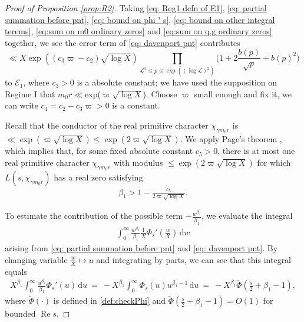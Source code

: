 \documentclass[12pt,reqno]{amsart}
\numberwithin{equation}{section}
\theoremstyle{plain}
\theoremstyle{definition}
\theoremstyle{remark}
\renewcommand{\Re}{\operatorname{Re}}
\newcommand{\dd}{\mathrm{d}}
\begin{document}
\begin{proof}[Proof of Proposition \ref{prop:R2}]
Taking \eqref{eq: Reg1 defn of E1}, \eqref{eq:  partial summation before pnt}, \eqref{eq: bound on phi ' s}, \eqref{eq: bound on other integral terems}, \eqref{eq:sum on m0 ordinary zeros} and \eqref{eq:sum on q,g ordinary zeros} together,
we see the error term of \eqref{eq:  davenport pnt} contributes
\begin{equation*}\label{eq: regime I ordinary zeros}
  \ll X \exp((c_3\varpi-c_2)\sqrt{\log X})\prod_{\mathcal{L}^2\leq p \leq \exp((\log \mathcal{L})^2)}\bigg(1+2\frac{b(p)}{\sqrt{p}}+b(p)^2\bigg)
\end{equation*}
to $\mathcal{E}_1$, where $c_3>0$ is a absolute constant; we have used the supposition on Regime I that $m_0r \ll $exp($\varpi \sqrt{\log X}$). Choose $\varpi$ small enough and fix it, we can write $c_4=c_2-c_3\varpi >0$ is a constant.

Recall that the conductor of the real primitive character $\chi_{\gamma m_0r}$ is $\ll \exp(\varpi \sqrt{\log X}) \leq \exp(2\varpi \sqrt{\log X})$. We apply Page's theorem \cite[equation (9) of Chapter 14]{Da00}, which implies that, for some fixed absolute constant $c_5>0$, there is at most one real primitive character $\chi_{\gamma m_0r}$ with modulus $\leq \exp(2\varpi \sqrt{\log X})$ for which $L(s,\chi_{\gamma m_0r})$ has a real zero satisfying
\begin{align}\label{eq:  lower bound for exceptional beta 1}
\beta_1 > 1 - \frac{c_5}{2\varpi \sqrt{\log X}}.
\end{align}

To estimate the contribution of the possible term $ -\frac{w^{\beta_1}}{\beta_1}$, we evaluate the integral
\begin{align*}
\int_0^{\infty} \frac{w^{\beta_1}}{\beta_1}
\frac{1}{X}\Phi_s'\left(\frac{w}{X}\right) \,\dd w
\end{align*}
arising from \eqref{eq: partial summation before pnt} and \eqref{eq:  davenport pnt}. By changing variable $\frac{w}{X}\mapsto u$ and integrating by parts, we can see that this integral equals
\begin{align*}
 X^{\beta_1}\int_0^{\infty} \frac{u^{\beta_1}}{\beta_1}\Phi_s'(u) \,\dd u \ = \ -X^{\beta_1}\int_0^{\infty}\Phi_s(u)
 u^{\beta_1-1}\,\dd u \ = \ -X^{\beta_1} \check\Phi\left( \frac{s}{2}+\beta_1-1\right),
\end{align*}
where $\check\Phi(\cdot)$ is defined in \eqref{def:checkPhi} and $\check\Phi\left( \frac{s}{2}+\beta_1-1\right)=O(1)$
for bounded $\Re s$.


\end{proof}
\end{document}
